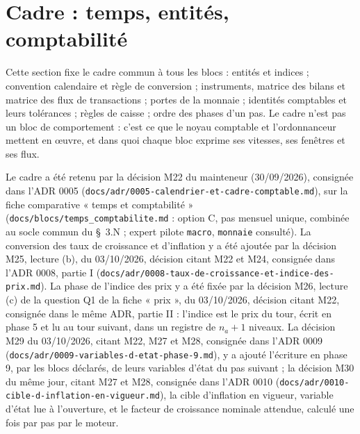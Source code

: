 \documentclass[11pt,a4paper]{article}
\begin{document}
\section{Cadre : temps, entités, comptabilité}
\label{sec:cadre}
Cette section fixe le cadre commun à tous les blocs : entités et indices ; convention calendaire et règle de conversion ; instruments, matrice des bilans et matrice des flux de transactions ; portes de la monnaie ; identités comptables et leurs tolérances ; règles de caisse ; ordre des phases d'un pas. Le cadre n'est pas un bloc de comportement : c'est ce que le noyau comptable et l'ordonnanceur mettent en œuvre, et dans quoi chaque bloc exprime ses vitesses, ses fenêtres et ses flux.

{\setlength{\emergencystretch}{3em}Le cadre a été retenu par la décision M22 du mainteneur (30/09/2026), consignée dans l'ADR 0005 (\nolinkurl{docs/adr/0005-calendrier-et-cadre-comptable.md}), sur la fiche comparative « temps et comptabilité » (\nolinkurl{docs/blocs/temps_comptabilite.md} : option C, pas mensuel unique, combinée au socle commun du \S~3.N ; expert pilote \texttt{macro}, \texttt{monnaie} consulté). La conversion des taux de croissance et d'inflation y a été ajoutée par la décision M25, lecture (b), du 03/10/2026, décision citant M22 et M24, consignée dans l'ADR 0008, partie I (\nolinkurl{docs/adr/0008-taux-de-croissance-et-indice-des-prix.md}). La phase de l'indice des prix y a été fixée par la décision M26, lecture (c) de la question Q1 de la fiche « prix », du 03/10/2026, décision citant M22, consignée dans le même ADR, partie II : l'indice est le prix du tour, écrit en phase 5 et lu au tour suivant, dans un registre de $n_a + 1$ niveaux. La décision M29 du 03/10/2026, citant M22, M27 et M28, consignée dans l'ADR 0009 (\nolinkurl{docs/adr/0009-variables-d-etat-phase-9.md}), y a ajouté l'écriture en phase 9, par les blocs déclarés, de leurs variables d'état du pas suivant ; la décision M30 du même jour, citant M27 et M28, consignée dans l'ADR 0010 (\nolinkurl{docs/adr/0010-cible-d-inflation-en-vigueur.md}), la cible d'inflation en vigueur, variable d'état lue à l'ouverture, et le facteur de croissance nominale attendue, calculé une fois par pas par le moteur.\par}
\end{document}
